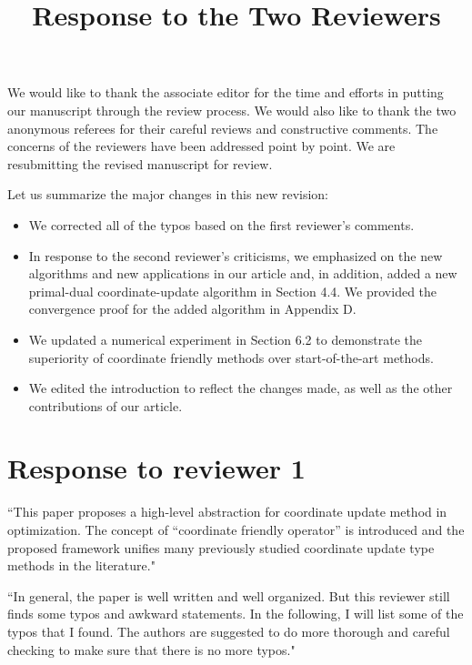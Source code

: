 \documentclass[amsa]{ipart}
\begin{document}
\title{Response to the Two Reviewers}
\vspace{5mm}

We would like to thank the associate editor for the time and efforts in putting our manuscript through the review process. We would also like to thank the two anonymous referees for their careful reviews and constructive comments. The concerns of the reviewers have been addressed point by point. We are resubmitting the revised manuscript for review. 

Let us summarize the major changes in this new revision:
\begin{itemize}
\item We corrected all of the typos based on the first reviewer's comments. 
\item In response to the second reviewer's criticisms, we emphasized on the new algorithms and new applications  in our article and, in addition,  added a new primal-dual coordinate-update algorithm in Section 4.4. We provided the convergence proof for the added algorithm   in Appendix D.
\item We updated a  numerical experiment in Section 6.2 to demonstrate the superiority of coordinate friendly methods over start-of-the-art methods. 
\item We edited the introduction to reflect the changes made, as well as the other contributions of our article.
\end{itemize}

\section{Response to reviewer 1}
``This paper proposes a high-level abstraction for coordinate update method in optimization. The concept of ``coordinate friendly operator'' is introduced and the proposed framework unifies many previously studied coordinate update type methods in the literature."

``In general, the paper is well written and well organized. But this reviewer still finds some typos and awkward statements. In the following, I will list some of the typos that I found. The authors are suggested to do more thorough and careful checking to make sure that there is no more typos."

\end{document}
